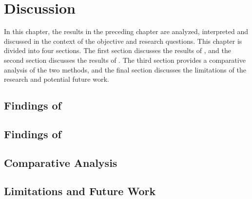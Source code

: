 \chapter{Discussion}

In this chapter, the results in the preceding chapter are analyzed, interpreted and discussed in the context of the objective and research questions. This chapter is divided into four sections. The first section discusses the results of , and the second section discusses the results of . The third section provides a comparative analysis of the two methods, and the final section discusses the limitations of the research and potential future work.

\section{Findings of }

\section{Findings of }

\section{Comparative Analysis}

\section{Limitations and Future Work}